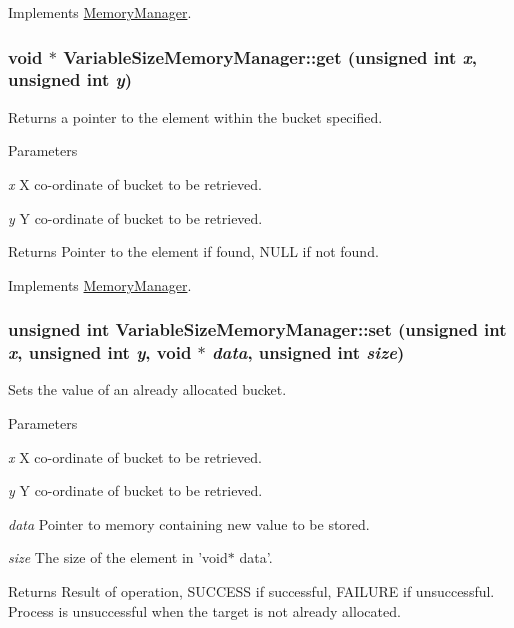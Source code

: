 Implements \hyperlink{classMemoryManager_af63cdf4a0fdbd5eb328e13959ff4c5b5}{MemoryManager}.

\hypertarget{classVariableSizeMemoryManager_a9be29ac3fbaba3824820d6d9a6e81243}{
\subsubsection[{get}]{\setlength{\rightskip}{0pt plus 5cm}void $\ast$ VariableSizeMemoryManager::get (unsigned int {\em x}, \/  unsigned int {\em y})}}
\label{classVariableSizeMemoryManager_a9be29ac3fbaba3824820d6d9a6e81243}
Returns a pointer to the element within the bucket specified.


\begin{DoxyParams}{Parameters}
\item[{\em x}]X co-\/ordinate of bucket to be retrieved. \item[{\em y}]Y co-\/ordinate of bucket to be retrieved.\end{DoxyParams}
\begin{DoxyReturn}{Returns}
Pointer to the element if found, NULL if not found. 
\end{DoxyReturn}


Implements \hyperlink{classMemoryManager_ad1786ab026c6077405e3c963e05d4a26}{MemoryManager}.

\hypertarget{classVariableSizeMemoryManager_af13ce44cb2a151e6e31723b29e6a129d}{
\subsubsection[{set}]{\setlength{\rightskip}{0pt plus 5cm}unsigned int VariableSizeMemoryManager::set (unsigned int {\em x}, \/  unsigned int {\em y}, \/  void $\ast$ {\em data}, \/  unsigned int {\em size})}}
\label{classVariableSizeMemoryManager_af13ce44cb2a151e6e31723b29e6a129d}
Sets the value of an already allocated bucket.


\begin{DoxyParams}{Parameters}
\item[{\em x}]X co-\/ordinate of bucket to be retrieved. \item[{\em y}]Y co-\/ordinate of bucket to be retrieved. \item[{\em data}]Pointer to memory containing new value to be stored. \item[{\em size}]The size of the element in 'void$\ast$ data'.\end{DoxyParams}
\begin{DoxyReturn}{Returns}
Result of operation, SUCCESS if successful, FAILURE if unsuccessful. Process is unsuccessful when the target is not already allocated. 
\end{DoxyReturn}


